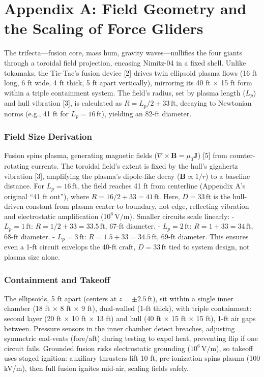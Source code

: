\documentclass[11pt]{article}
\begin{document}
	\newpage
	\section*{Appendix A: Field Geometry and the Scaling of Force Gliders}
	The trifecta—fusion core, mass hum, gravity waves—nullifies the four giants through a toroidal field projection, encasing Nimitz-04 in a fixed shell. Unlike tokamaks, the Tic-Tac’s fusion device [2] drives twin ellipsoid plasma flows (16 ft long, 6 ft wide, 4 ft thick, 5 ft apart vertically), mirroring its 40 ft × 15 ft form within a triple containment system. The field’s radius, set by plasma length (\( L_p \)) and hull vibration [3], is calculated as \( R = L_p / 2 + 33 \, \text{ft} \), decaying to Newtonian norms (e.g., 41 ft for \( L_p = 16 \, \text{ft} \)), yielding an 82-ft diameter.
	
	\subsubsection{Field Size Derivation}
	Fusion spins plasma, generating magnetic fields (\(\nabla \times \mathbf{B} = \mu_0 \mathbf{J}\)) [5] from counter-rotating currents. The toroidal field’s extent is fixed by the hull’s gigahertz vibration [3], amplifying the plasma’s dipole-like decay (\(\mathbf{B} \propto 1/r\)) to a baseline distance. For \( L_p = 16 \, \text{ft} \), the field reaches 41 ft from centerline (Appendix A’s original “41 ft out”), where \( R = 16/2 + 33 = 41 \, \text{ft} \). Here, \( D = 33 \, \text{ft} \) is the hull-driven constant from plasma center to boundary, not edge, reflecting vibration and electrostatic amplification (\(10^6 \, \text{V/m}\)). Smaller circuits scale linearly:
	- \( L_p = 1 \, \text{ft} \): \( R = 1/2 + 33 = 33.5 \, \text{ft} \), 67-ft diameter.
	- \( L_p = 2 \, \text{ft} \): \( R = 1 + 33 = 34 \, \text{ft} \), 68-ft diameter.
	- \( L_p = 3 \, \text{ft} \): \( R = 1.5 + 33 = 34.5 \, \text{ft} \), 69-ft diameter.
	This ensures even a 1-ft circuit envelops the 40-ft craft, \( D = 33 \, \text{ft} \) tied to system design, not plasma size alone.
	
	\subsubsection{Containment and Takeoff}
	The ellipsoids, 5 ft apart (centers at \( z = \pm 2.5 \, \text{ft} \)), sit within a single inner chamber (18 ft × 8 ft × 9 ft), dual-walled (1-ft thick), with triple containment: second layer (20 ft × 10 ft × 13 ft) and hull (40 ft × 15 ft × 15 ft), 1-ft air gaps between. Pressure sensors in the inner chamber detect breaches, adjusting symmetric end-vents (fore/aft) during testing to expel heat, preventing flip if one circuit fails. Grounded fusion risks electrostatic grounding (\(10^6 \, \text{V/m}\)), so takeoff uses staged ignition: auxiliary thrusters lift 10 ft, pre-ionization spins plasma (100 kV/m), then full fusion ignites mid-air, scaling fields safely.
	
\end{document}
